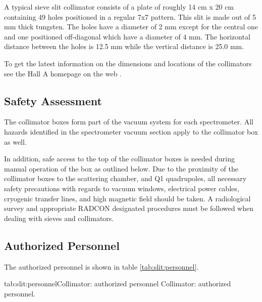 A typical sieve slit collimator 
consists of a plate of roughly 14 cm x 20 cm containing 49 holes
positioned in a regular 7x7 pattern. This slit is made out of 5
mm thick tungsten.
The holes have a diameter of 2 mm except for the central one and one positioned
off-diagonal which have a diameter of 4 mm. The horizontal distance between the
holes is 12.5 mm while the vertical distance is 25.0 mm.

To get the latest information on the dimensions and locations of the collimators see 
the Hall A homepage on the web%
.

\begin{safetyen}{10}{15}
\subsection{Safety Assessment}

The collimator boxes form part of the vacuum system for each spectrometer. All hazards
identified in the spectrometer vacuum section apply to the collimator box as well.

In addition, safe access to the top of
the collimator boxes is needed  during manual operation of the box as outlined below.
Due to the proximity of the collimator boxes to the scattering chamber, and Q1 quadrupoles,
all necessary safety precautions with regards to vacuum windows, electrical power cables, 
cryogenic transfer lines, and high magnetic field should be taken. A radiological survey and
appropriate RADCON designated procedures must be followed when dealing with sieves 
and collimators.
\end{safetyen}


\begin{safetyen}{10}{15}
\subsection{Authorized  Personnel} 
\end{safetyen}
The authorized personnel is shown in table \ref{tab:slit:personnel}.
\begin{namestab}{tab:slit:personnel}{Collimator: authorized personnel}{%
      Collimator: authorized personnel.}
\end{namestab}


